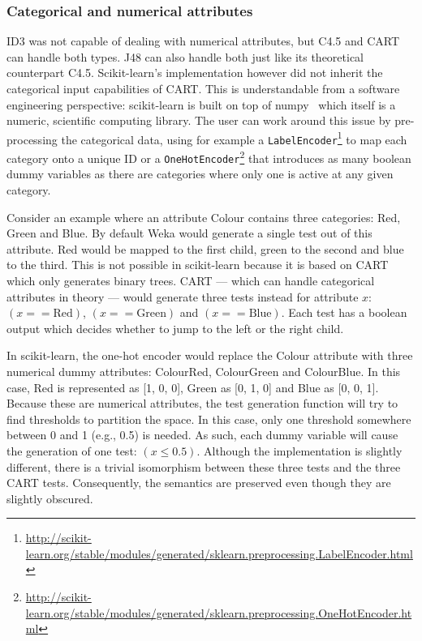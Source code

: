 \subsubsection{Categorical and numerical attributes}
ID3 was not capable of dealing with numerical attributes, but C4.5 and CART can handle both types. J48 can also handle both just like its theoretical counterpart C4.5. Scikit-learn's implementation however did not inherit the categorical input capabilities of CART. This is understandable from a software engineering perspective: scikit-learn is built on top of numpy~\cite{numpy} which itself is a numeric, scientific computing library. The user can work around this issue by pre-processing the categorical data, using for example a \texttt{LabelEncoder}\footnote{\url{http://scikit-learn.org/stable/modules/generated/sklearn.preprocessing.LabelEncoder.html}} to map each category onto a unique ID or a \texttt{OneHotEncoder}\footnote{\url{http://scikit-learn.org/stable/modules/generated/sklearn.preprocessing.OneHotEncoder.html}} that introduces as many boolean dummy variables as there are categories where only one is active at any given category.

Consider an example where an attribute Colour contains three categories: Red, Green and Blue. By default Weka would generate a single test out of this attribute. Red would be mapped to the first child, green to the second and blue to the third. This is not possible in scikit-learn because it is based on CART which only generates binary trees. CART --- which can handle categorical attributes in theory --- would generate three tests instead for attribute $x$: $(x == \text{Red})$, $(x == \text{Green})$ and $(x == \text{Blue})$. Each test has a boolean output which decides whether to jump to the left or the right child. 

In scikit-learn, the one-hot encoder would replace the Colour attribute with three numerical dummy attributes: ColourRed, ColourGreen and ColourBlue. In this case, Red is represented as [1, 0, 0], Green as [0, 1, 0] and Blue as [0, 0, 1]. Because these are numerical attributes, the test generation function will try to find thresholds to partition the space. In this case, only one threshold somewhere between 0 and 1 (e.g., 0.5) is needed. As such, each dummy variable will cause the generation of one test: $(x \leqslant 0.5)$. Although the implementation is slightly different, there is a trivial isomorphism between these three tests and the three CART tests. Consequently, the semantics are preserved even though they are slightly obscured.

